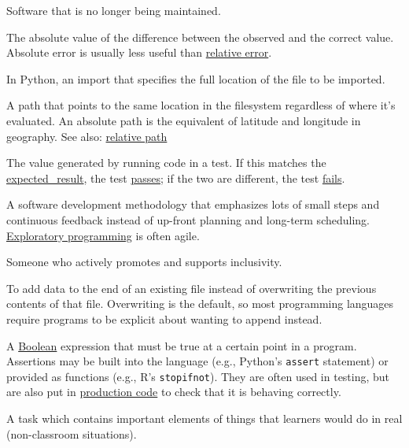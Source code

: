 \documentclass[
]{krantz}
\providecommand{\tightlist}{%
  \setlength{\itemsep}{0pt}\setlength{\parskip}{0pt}}
\begin{document}
\begin{description}
\tightlist
\item[\textbf{abandonware}]
Software that is no longer being maintained.
\item[\textbf{absolute error}]
The absolute value of the difference between the observed and the correct value. Absolute error is usually less useful than \protect\hyperlink{relative_error}{relative error}.
\item[\textbf{absolute import}]
In Python, an import that specifies the full location of the file to be imported.
\item[\textbf{absolute path}]
A path that points to the same location in the filesystem regardless of where it's evaluated. An absolute path is the equivalent of latitude and longitude in geography. See also: \protect\hyperlink{relative_path}{relative path}
\item[\textbf{actual result (of test)}]
The value generated by running code in a test. If this matches the \protect\hyperlink{expected_result}{expected\_result}, the test \protect\hyperlink{pass_test}{passes}; if the two are different, the test \protect\hyperlink{fail_test}{fails}.
\item[\textbf{agile development}]
A software development methodology that emphasizes lots of small steps and continuous feedback instead of up-front planning and long-term scheduling. \protect\hyperlink{exploratory_programming}{Exploratory programming} is often agile.
\item[\textbf{ally}]
Someone who actively promotes and supports inclusivity.
\item[\textbf{append mode}]
To add data to the end of an existing file instead of overwriting the previous contents of that file. Overwriting is the default, so most programming languages require programs to be explicit about wanting to append instead.
\item[\textbf{assertion}]
A \protect\hyperlink{boolean}{Boolean} expression that must be true at a certain point in a program. Assertions may be built into the language (e.g., Python's \texttt{assert} statement) or provided as functions (e.g., R's \texttt{stopifnot}). They are often used in testing, but are also put in \protect\hyperlink{production_code}{production code} to check that it is behaving correctly.
\item[\textbf{authentic task}]
A task which contains important elements of things that learners would do in real (non-classroom situations).
\item[\textbf{auto-completion}]

\end{description}
\end{document}
